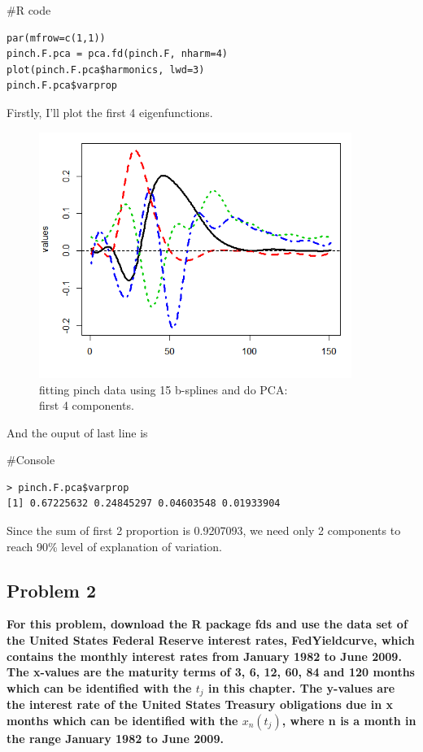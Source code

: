 \documentclass{article}
\newenvironment{Rcode}%
{%
    \begin{mdframed}
    \#R code
    \begin{small}
}
{%
    \end{small}
    \end{mdframed}
}
\newenvironment{console}%
{%
    \begin{mdframed}
    \#Console
    \begin{small}
}
{%
    \end{small}
    \end{mdframed}
}
\begin{document}
\begin{Rcode}
    \begin{verbatim}
par(mfrow=c(1,1))
pinch.F.pca = pca.fd(pinch.F, nharm=4)
plot(pinch.F.pca$harmonics, lwd=3)
pinch.F.pca$varprop
    \end{verbatim}
\end{Rcode}

Firstly, I'll plot the first 4 eigenfunctions.

\begin{figure}[hh]
    \centering
    \includegraphics[height=8cm]{pinch_F_pca_4components_plot.png}
    \caption{fitting pinch data using 15 b-splines and do PCA: \\ first 4 components.}
\end{figure}

And the ouput of last line is

\begin{console}
    \begin{verbatim}
> pinch.F.pca$varprop
[1] 0.67225632 0.24845297 0.04603548 0.01933904
    \end{verbatim}
\end{console}

Since the sum of first 2 proportion is 0.9207093, we need only 2 components to reach 90\% level of explanation of variation.


\newpage
\subsection{Problem 2}
\textbf{
For this problem, download the R package fds and use the data set of the United States Federal Reserve interest rates, FedYieldcurve,
which contains the monthly interest rates from January 1982 to June 2009.
The x-values are the maturity terms of 3, 6, 12, 60, 84 and 120 months which can be identified with the $t_j$ in this chapter.
The y-values are the interest rate of the United States Treasury obligations due in x months which can be identified with the $x_n(t_j)$,
where n is a month in the range January 1982 to June 2009.}
\end{document}
